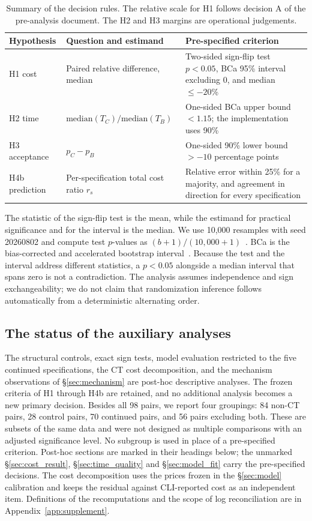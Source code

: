 \documentclass[a4paper,11pt]{article}
\begin{document}
\begin{table}[!htbp]
\centering\small
\begin{tabularx}{\linewidth}{p{20mm}Y Y}
\toprule Hypothesis & Question and estimand & Pre-specified criterion\\\midrule
H1 cost & Paired relative difference, median & Two-sided sign-flip test $p<0.05$, BCa 95\% interval excluding 0, and median $\leq-20$\%\\
H2 time & $\mathrm{median}(T_C)/\mathrm{median}(T_B)$ & One-sided BCa upper bound $<1.15$; the implementation uses 90\%\\
H3 acceptance & $p_C-p_B$ & One-sided 90\% lower bound $>-10$ percentage points\\
H4b prediction & Per-specification total cost ratio $r_s$ & Relative error within 25\% for a majority, and agreement in direction for every specification\\
\bottomrule
\end{tabularx}
\caption{Summary of the decision rules. The relative scale for H1 follows decision A of the pre-analysis document. The H2 and H3 margins are operational judgements.}
\end{table}

The statistic of the sign-flip test is the mean, while the estimand for practical significance and for the interval is the median. We use 10{,}000 resamples with seed 20260802 and compute test $p$-values as $(b+1)/(10{,}000+1)$~\cite{phipson}. BCa is the bias-corrected and accelerated bootstrap interval~\cite{bootstrap}. Because the test and the interval address different statistics, a $p<0.05$ alongside a median interval that spans zero is not a contradiction. The analysis assumes independence and sign exchangeability; we do not claim that randomization inference follows automatically from a deterministic alternating order.

\subsection{The status of the auxiliary analyses}
The structural controls, exact sign tests, model evaluation restricted to the five continued specifications, the CT cost decomposition, and the mechanism observations of \S\ref{sec:mechanism} are post-hoc descriptive analyses. The frozen criteria of H1 through H4b are retained, and no additional analysis becomes a new primary decision. Besides all 98 pairs, we report four groupings: 84 non-CT pairs, 28 control pairs, 70 continued pairs, and 56 pairs excluding both. These are subsets of the same data and were not designed as multiple comparisons with an adjusted significance level. No subgroup is used in place of a pre-specified criterion. Post-hoc sections are marked in their headings below; the unmarked \S\ref{sec:cost_result}, \S\ref{sec:time_quality} and \S\ref{sec:model_fit} carry the pre-specified decisions. The cost decomposition uses the prices frozen in the \S\ref{sec:model} calibration and keeps the residual against CLI-reported cost as an independent item. Definitions of the recomputations and the scope of log reconciliation are in Appendix~\ref{app:supplement}.
\end{document}
